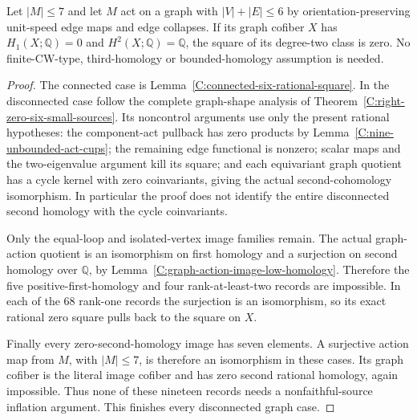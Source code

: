\begin{theorem}
\label{C:seven-source-six-state-rational-graph}
Let $|M|\leq7$ and let $M$ act on a graph with
$|V|+|E|\leq6$ by orientation-preserving unit-speed
edge maps and edge collapses.  If its graph cofiber
$X$ has $H_1(X;\mathbb Q)=0$ and
$H^2(X;\mathbb Q)=\mathbb Q$, the square of its
degree-two class is zero.  No finite-CW-type,
third-homology or bounded-homology assumption is needed.
\end{theorem}
\begin{proof}
The connected case is
Lemma~\ref{C:connected-six-rational-square}.
In the disconnected case follow the complete
graph-shape analysis of
Theorem~\ref{C:right-zero-six-small-sources}.
Its noncontrol arguments use only the present
rational hypotheses: the component-act pullback
has zero products by
Lemma~\ref{C:nine-unbounded-act-cups}; the remaining
edge functional is nonzero; scalar maps and the
two-eigenvalue argument kill its square; and each
equivariant graph quotient has a cycle kernel
with zero coinvariants, giving the actual
second-cohomology isomorphism.  In particular the
proof does not identify the entire disconnected
second homology with the cycle coinvariants.

Only the equal-loop and isolated-vertex image
families remain.  The actual graph-action
quotient is an isomorphism on first homology
and a surjection on second homology over
$\mathbb Q$, by
Lemma~\ref{C:graph-action-image-low-homology}.
Therefore the five positive-first-homology and
four rank-at-least-two records are impossible.
In each of the $68$ rank-one records the
surjection is an isomorphism, so its exact
rational zero square pulls back to the square
on $X$.

Finally every zero-second-homology image has
seven elements.  A surjective action map from
$M$, with $|M|\leq7$, is therefore an isomorphism
in these cases.  Its graph cofiber is the
literal image cofiber and has zero second
rational homology, again impossible.
Thus none of these nineteen records needs a
nonfaithful-source inflation argument.
This finishes every disconnected graph case.
\end{proof}

